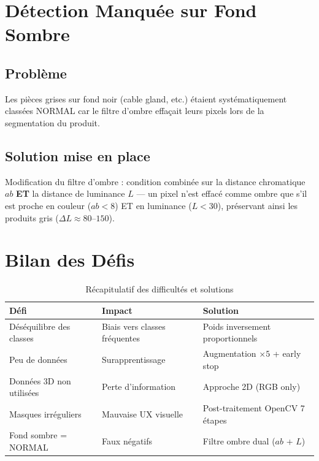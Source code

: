 \documentclass[12pt, a4paper]{report}
\begin{document}
\section{Détection Manquée sur Fond Sombre}

\subsection{Problème}

Les pièces grises sur fond noir (cable gland, etc.) étaient systématiquement classées NORMAL car le filtre d'ombre effaçait leurs pixels lors de la segmentation du produit.

\subsection{Solution mise en place}

Modification du filtre d'ombre : condition combinée sur la distance chromatique $ab$ \textbf{ET} la distance de luminance $L$ — un pixel n'est effacé comme ombre que s'il est proche en couleur ($ab < 8$) ET en luminance ($L < 30$), préservant ainsi les produits gris ($\Delta L \approx 80$--$150$).

\section{Bilan des Défis}

\begin{table}[H]
  \centering
  \caption{Récapitulatif des difficultés et solutions}
  \label{tab:challenges}
  \begin{tabular}{p{4cm}p{4.5cm}p{4.5cm}}
    \toprule
    \rowcolor{themebluevlight}
    \textbf{Défi} & \textbf{Impact} & \textbf{Solution} \\
    \midrule
    Déséquilibre des classes   & Biais vers classes fréquentes & Poids inversement proportionnels \\
    Peu de données             & Surapprentissage              & Augmentation $\times5$ + early stop \\
    Données 3D non utilisées   & Perte d'information           & Approche 2D (RGB only) \\
    Masques irréguliers        & Mauvaise UX visuelle          & Post-traitement OpenCV 7 étapes \\
    Fond sombre = NORMAL       & Faux négatifs                 & Filtre ombre dual ($ab$ + $L$) \\
    \bottomrule
  \end{tabular}
\end{table}
\end{document}
